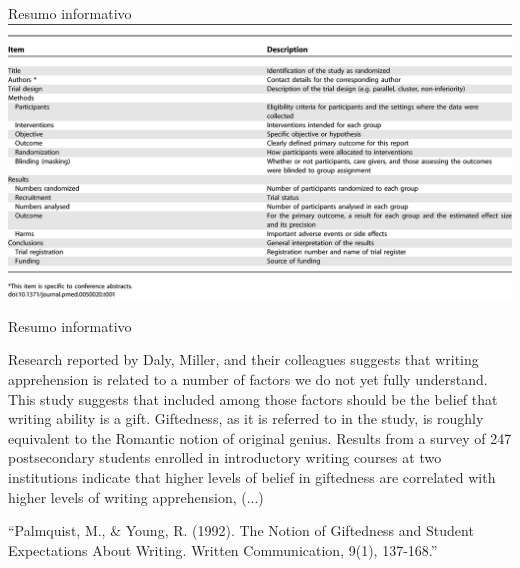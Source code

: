 \documentclass{beamer}
\begin{document}
\begin{frame}{Resumo informativo}
  \includegraphics[height=0.8\textheight]{resumo_estruturado}
\end{frame}

\begin{frame}{Resumo informativo}
  \begin{example}


    Research reported by Daly, Miller, and their colleagues suggests
    that writing apprehension is related to a number of factors we do
    not yet fully understand. This study suggests that included among
    those factors should be the belief that writing ability is a
    gift. Giftedness, as it is referred to in the study, is roughly
    equivalent to the Romantic notion of original genius. Results from
    a survey of 247 postsecondary students enrolled in introductory
    writing courses at two institutions indicate that higher levels of
    belief in giftedness are correlated with higher levels of writing
    apprehension, (...) 

  \end{example}
  ``Palmquist, M., \& Young, R. (1992). The Notion of Giftedness and
  Student Expectations About Writing. Written Communication, 9(1),
  137-168.''

\end{frame}
\end{document}

